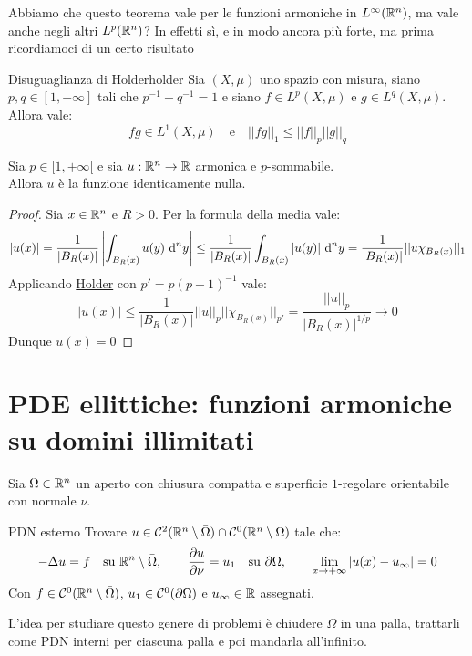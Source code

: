 \documentclass{article}
\begin{document}
Abbiamo che questo teorema vale per le funzioni armoniche in $L^\infty(\mathbb{R}^n)$, ma vale anche negli altri $L^p(\mathbb{R}^n)$? In effetti sì, e in modo ancora più forte, ma prima ricordiamoci di un certo risultato

\begin{lemma}{Disuguaglianza di Holder}{holder}
    Sia $(X,\mu)$ uno spazio con misura, siano $p,q \in [1,+\infty]$ tali che $p^{-1}+q^{-1}= 1$ e siano $f\in L^p(X,\mu)$ e $g \in L^q(X,\mu)$. Allora vale:
    \[f g \in L^1(X,\mu) \quad \text{e}\quad ||fg||_1 \le ||f||_p||g||_q\]
\end{lemma}

\begin{theorem}{}{}
    Sia $p \in [1,+\infty[$ e sia $u:\mathbb{R}^n\to\mathbb{R}$ armonica e $p$-sommabile.\\
    Allora $u$ è la funzione identicamente nulla.
\end{theorem}
\begin{proof}
    Sia $x \in \mathbb{R}^n$ e $R>0$. Per la formula della media vale:
    \[|u(x)| = \frac{1}{|B_R(x)|}\left| \int_{B_R(x)} u(y)\text{ d}^n y\right| \le \frac{1}{|B_R(x)|}\int_{B_R(x)} |u(y)|\text{ d}^n y = \frac{1}{|B_R(x)|} ||u \chi_{B_R(x)}||_1\]
    Applicando \href{lemma:holder}{Holder} con $p' = p(p-1)^{-1}$ vale:
    \[|u(x)|\le \frac{1}{|B_R(x)|} ||u||_p ||\chi_{B_R(x)}||_{p'} = \frac{||u||_p}{|B_R(x)|^{1/p}} \to 0\]
    Dunque $u(x) = 0$
\end{proof}

\section{PDE ellittiche: funzioni armoniche su domini illimitati}

Sia $\Omega \in \mathbb{R}^n$ un aperto con chiusura compatta e superficie $1$-regolare orientabile con normale $\nu$.

\begin{definition}{PDN esterno}{}
    Trovare $u\in \mathcal{C}^2(\mathbb{R}^n\setminus \bar{\Omega})\cap \mathcal{C}^0(\mathbb{R}^n\setminus\Omega)$ tale che:
    \[-\Delta u = f \quad \text{su }\mathbb{R}^n\setminus\bar{\Omega}, \qquad \frac{\partial u}{\partial \nu} = u_1 \quad \text{su }\partial\Omega, \qquad \lim_{x\to+\infty} |u(x)-u_\infty| = 0 \]
    Con $f \in \mathcal{C}^0(\mathbb{R}^n\setminus\bar{\Omega})$, $u_1 \in \mathcal{C}^0(\partial\Omega)$ e $u_\infty\in\mathbb{R}$ assegnati. 
\end{definition}

L'idea per studiare questo genere di problemi è chiudere $\Omega$ in una palla, trattarli come PDN interni per ciascuna palla e poi mandarla all'infinito.
\end{document}
